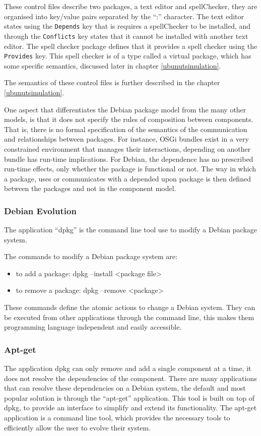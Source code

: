 These control files describe two packages, a text editor and spellChecker, they are organised into key/value pairs separated by the ``:'' character.
The text editor states using the \verb+Depends+ key that is requires a spellChecker to be installed, 
and through the \verb+Conflicts+ key states that it cannot be installed with another text editor.
The spell checker package defines that it provides a spell checker using the \verb+Provides+ key.
This spell checker is of a type called a virtual package, which has some specific semantics, discussed later in chapter \ref{ubunutsimulation}.

The semantics of these control files is further described in the chapter \ref{ubunutsimulation}.

One aspect that differentiates the Debian package model from the many other models, is that it does not specify the rules of composition between components.
That is, there is no formal specification of the semantics of the communication and relationships between packages.
For instance, OSGi bundles exist in a very constrained environment that manages their interactions, depending on another bundle has run-time implications.
For Debian, the dependence has no prescribed run-time effects, only whether the package is functional or not.
The way in which a package, uses or communicates with a depended upon package is then defined between the packages and not in the component model.

\subsubsection{Debian Evolution}
The application ``dpkg'' is the command line tool use to modify a Debian package system.

The commands to modify a Debian package system are:
\begin{itemize}
  \item to add a package: dpkg --install <package file>
  \item to remove a package: dpkg --remove <package>
\end{itemize}

These commands define the atomic actions to change a Debian system.
They can be executed from other applications through the command line, this makes them programming language independent and easily accessible. 

\subsubsection{Apt-get}
The application dpkg can only remove and add a single component at a time, it does not resolve the dependencies of the component.
There are many applications that can resolve these dependencies on a Debian system, the default and most popular solution is through the ``apt-get'' application.
This tool is built on top of dpkg, to provide an interface to simplify and extend its functionality.
The apt-get application is a command line tool, which provides the necessary tools to efficiently allow the user to evolve their system.

